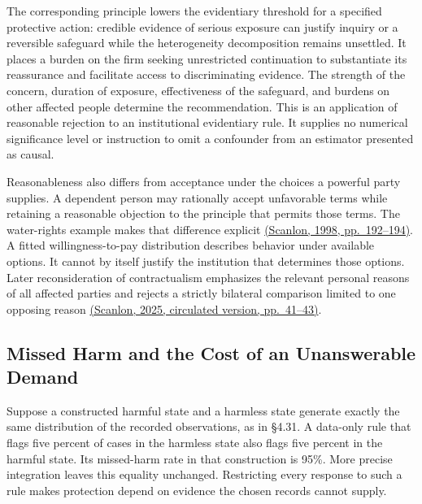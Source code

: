 The corresponding principle lowers the evidentiary threshold for a
specified protective action: credible evidence of serious exposure can
justify inquiry or a reversible safeguard while the heterogeneity
decomposition remains unsettled. It places a burden on the firm seeking
unrestricted continuation to substantiate its reassurance and facilitate
access to discriminating evidence. The strength of the concern, duration
of exposure, effectiveness of the safeguard, and burdens on other
affected people determine the recommendation. This is an application of
reasonable rejection to an institutional evidentiary rule. It supplies
no numerical significance level or instruction to omit a confounder from
an estimator presented as causal.

Reasonableness also differs from acceptance under the choices a powerful
party supplies. A dependent person may rationally accept unfavorable
terms while retaining a reasonable objection to the principle that
permits those terms. The water-rights example makes that difference
explicit
\href{https://e-edu.nbu.bg/pluginfile.php/314831/mod_resource/content/0/scanlon_5.1-3.pdf}{(Scanlon,
1998, pp.~192--194)}. A fitted willingness-to-pay distribution describes
behavior under available options. It cannot by itself justify the
institution that determines those options. Later reconsideration of
contractualism emphasizes the relevant personal reasons of all affected
parties and rejects a strictly bilateral comparison limited to one
opposing reason
\href{https://www.law.nyu.edu/sites/default/files/2025-09/T.\%20M.\%20Scanlon\%2C\%20Contractualism\%20and\%20Intuitionism.pdf}{(Scanlon,
2025, circulated version, pp.~41--43)}.

\hypertarget{M09-missed-harm-and-the-cost-of-an-unanswerable-demand}{%
\subsection{Missed Harm and the Cost of an Unanswerable
Demand}\label{M09-missed-harm-and-the-cost-of-an-unanswerable-demand}}

\noindent \noindent Suppose a constructed harmful state and a harmless state
generate exactly the same distribution of the recorded observations, as
in §4.31. A data-only rule that flags five percent of cases in the
harmless state also flags five percent in the harmful state. Its
missed-harm rate in that construction is 95\%. More precise integration
leaves this equality unchanged. Restricting every response to such a
rule makes protection depend on evidence the chosen records cannot
supply.

